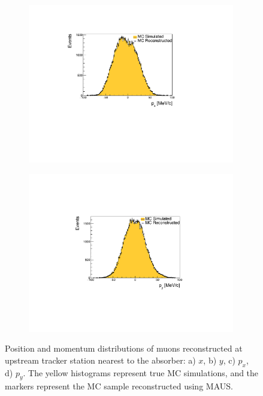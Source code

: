 \documentclass[11pt,a4paper]{article}
\begin{document}
\begin{figure}[t!]
\begin{subfigure}[t]{0.495\textwidth}
\centering
\includegraphics[width=0.99\textwidth]{figs/fig-tracker-px.pdf}
\caption{}
\end{subfigure}
\begin{subfigure}[t]{0.495\textwidth}
\centering
\includegraphics[width=0.99\textwidth]{figs/fig-tracker-py.pdf}
\caption{}
\end{subfigure}

\caption{Position and momentum distributions of muons reconstructed at upstream
tracker station nearest to the absorber: a) $x$, b) $y$, c) $p_x$, d) $p_y$. The yellow histograms represent true MC simulations, and the markers represent the MC sample reconstructed using MAUS.}
\label{fig:tracker-posmom}
\end{figure}
\end{document}
